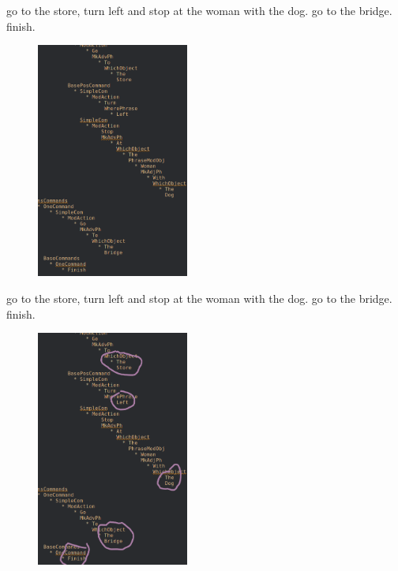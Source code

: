 \documentclass{beamer}
\begin{document}


\begin{frame}
\fontsize{9pt}{10pt}\selectfont
\begin{exampleblock}{}
go to the store, turn left and stop at the woman with the dog. go to the bridge.
finish.
\end{exampleblock}

\begin{figure}

\centering
\includegraphics[width=50mm]{pics/zoomedScreenshot.png}
\end{figure}
\end{frame}

\begin{frame}
\fontsize{9pt}{10pt}\selectfont
\begin{exampleblock}{}
go to the store, turn left and stop at the woman with the dog. go to the bridge.
finish.
\end{exampleblock}

\begin{figure}

\centering
\includegraphics[width=50mm]{pics/circledZoom.png}
\end{figure}
\end{frame}
\end{document}

